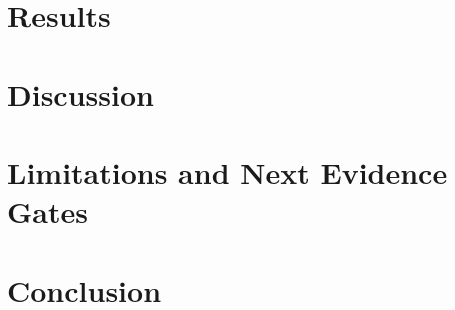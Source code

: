 \documentclass[11pt]{article}
\begin{document}
\section{Results}


\section{Discussion}


\section{Limitations and Next Evidence Gates}


\section{Conclusion}

\end{document}
